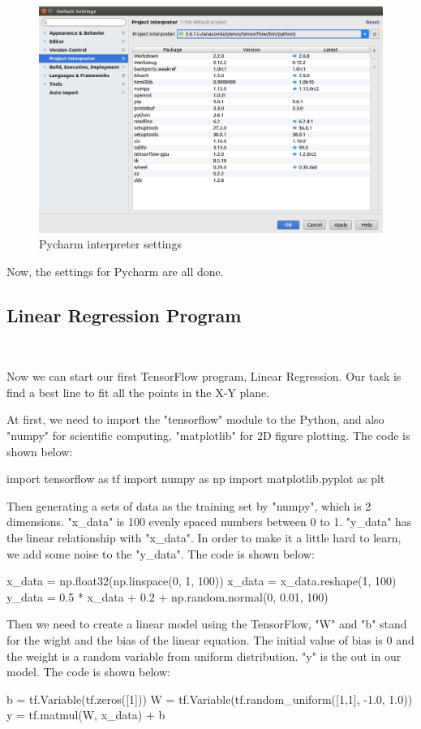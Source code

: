 \documentclass[12pt,letterpaper]{article}
\begin{document}
	\begin{figure}[http]
		\centering
		\includegraphics[scale=0.35]{./PycharmSetting.png}
		\caption{\label{Fig:PycharmSetting}Pycharm interpreter settings}
	\end{figure}
		Now, the settings for Pycharm are all done. 
	\subsection{Linear Regression Program}\
	\label{sec:LinearRegProgram} 
	
	Now we can start our first TensorFlow program, Linear Regression. Our task is find a best line to fit all the points in the X-Y plane. \par
	At first, we need to import the "tensorflow" module to the Python, and also "numpy" for scientific computing, "matplotlib" for 2D figure plotting. The code is shown below:
	\begin{python}
		import tensorflow as tf
		import numpy as np
		import matplotlib.pyplot as plt  
	\end{python}
		
	Then generating a sets of data as the training set by "numpy", which is 2 dimensions. "x\_data" is 100 evenly spaced numbers between 0 to 1. "y\_data" has the linear relationship with "x\_data". In order to make it a little hard to learn, we add some noise to the "y\_data". The code is shown below:
	\begin{python}
		x_data = np.float32(np.linspace(0, 1, 100)) 
		x_data = x_data.reshape(1, 100)
		y_data = 0.5 * x_data + 0.2 + np.random.normal(0, 0.01, 100)
	\end{python}

	Then we need to create a linear model using the TensorFlow, "W" and "b" stand for the wight  and the bias of the linear equation. The initial value of bias is 0 and the weight is a random variable from uniform distribution. "y" is the out in our model. The code is shown below:
	 \begin{python}
		b = tf.Variable(tf.zeros([1]))
		W = tf.Variable(tf.random_uniform([1,1], -1.0, 1.0))
		y = tf.matmul(W, x_data) + b
	 \end{python}
 
\end{document}
